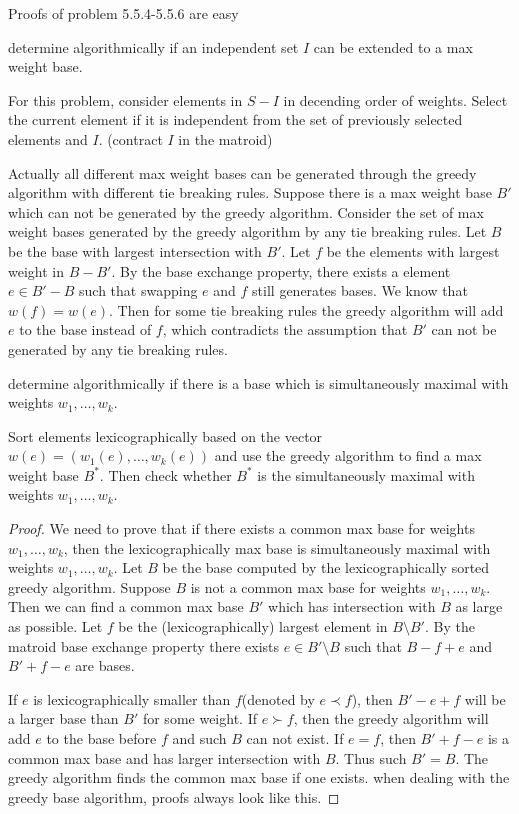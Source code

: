 Proofs of problem 5.5.4-5.5.6 are easy

\begin{nproblem}[5.5.7]
    determine algorithmically if an independent set $I$ can be extended to a max weight base.
\end{nproblem}
For this problem, consider elements in $S-I$ in decending order of weights. Select the current element if it is independent from the set of previously selected elements and $I$. (contract $I$ in the matroid)

Actually all different max weight bases can be generated through the greedy algorithm with different tie breaking rules. Suppose there is a max weight base $B'$ which can not be generated by the greedy algorithm. Consider the set of max weight bases generated by the greedy algorithm by any tie breaking rules. Let $B$ be the base with largest intersection with $B'$. Let $f$ be the elements with largest weight in $B-B'$. By the base exchange property, there exists a element $e\in B'-B$ such that swapping $e$ and $f$ still generates bases. We know that $w(f)=w(e)$. Then for some tie breaking rules the greedy algorithm will add $e$ to the base instead of $f$, which contradicts the assumption that $B'$ can not be generated by any tie breaking rules.

\begin{nproblem}[5.5.8]
    determine algorithmically if there is a base which is simultaneously maximal with weights $w_1,\dots,w_k$.
\end{nproblem}
Sort elements lexicographically based on the vector $w(e)=(w_1(e),\dots,w_k(e))$ and use the greedy algorithm to find a max weight base $B^*$. Then check whether $B^*$ is the simultaneously maximal with weights $w_1,\dots,w_k$.
\begin{proof}
    We need to prove that if there exists a common max base for weights $w_1,\dots,w_k$, then the lexicographically max base is simultaneously maximal with weights $w_1,\dots,w_k$. 
    Let $B$ be the base computed by the lexicographically sorted greedy algorithm.
    Suppose $B$ is not a common max base for weights $w_1,\dots,w_{k}$. Then we can find a common max base $B'$ which has intersection with $B$ as large as possible. Let $f$ be the (lexicographically) largest element in $B\setminus B'$. By the matroid base exchange property there exists $e\in B'\setminus B$ such that $B-f+e$ and $B'+f-e$ are bases.

    If $e$ is lexicographically smaller than $f$(denoted by $e\prec f$), then $B'-e+f$ will be a larger base than $B'$ for some weight. If $e\succ f$, then the greedy algorithm will add $e$ to the base before $f$ and such $B$ can not exist. If $e=f$, then $B'+f-e$ is a common max base and has larger intersection with $B$. Thus such $B'=B$. The greedy algorithm finds the common max base if one exists.
    \scriptsize{when dealing with the greedy base algorithm, proofs always look like this.}
\end{proof}


